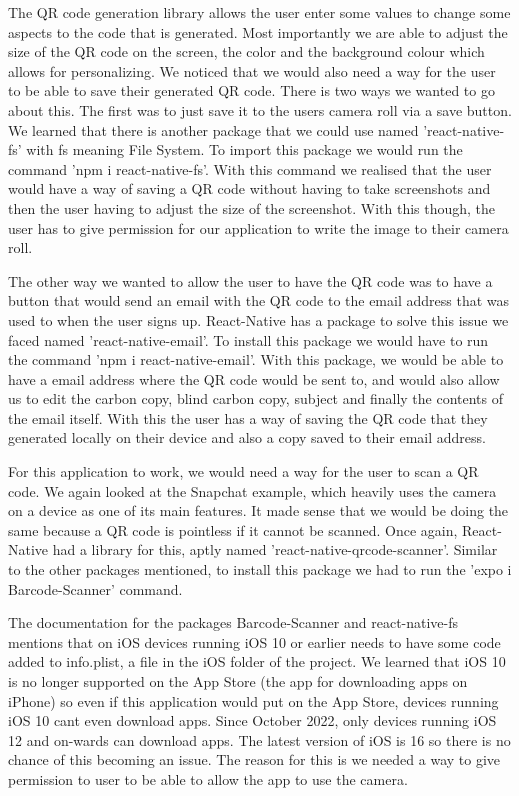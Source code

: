The QR code generation library allows the user enter some values to change some aspects to the code that is generated. Most importantly we are able to adjust the size of the QR code on the screen, the color and the background colour which allows for personalizing. We noticed that we would also need a way for the user to be able to save their generated QR code. There is two ways we wanted to go about this. The first was to just save it to the users camera roll via a save button. We learned that there is another package that we could use named 'react-native-fs'\cite{rnfs} with fs meaning File System. To import this package we would run the command 'npm i react-native-fs'. With this command we realised that the user would have a way of saving a QR code without having to take screenshots and then the user having to adjust the size of the screenshot. With this though, the user has to give permission for our application to write the image to their camera roll. 

The other way we wanted to allow the user to have the QR code was to have a button that would send an email with the QR code to the email address that was used to when the user signs up. React-Native has a package to solve this issue we faced named 'react-native-email\cite{npmEmail}'. To install this package we would have to run the command 'npm i react-native-email'. With this package, we would be able to have a email address where the QR code would be sent to, and would also allow us to edit the carbon copy, blind carbon copy, subject and finally the contents of the email itself. With this the user has a way of saving the QR code that they generated locally on their device and also a copy saved to their email address. 

For this application to work, we would need a way for the user to scan a QR code. We again looked at the Snapchat example, which heavily uses the camera on a device as one of its main features. It made sense that we would be doing the same because a QR code is pointless if it cannot be scanned. Once again, React-Native had a library for this, aptly named 'react-native-qrcode-scanner'. Similar to the other packages mentioned, to install this package we had to run the 'expo i Barcode-Scanner' command\cite{barCodeScaner}.

The documentation for the packages Barcode-Scanner and react-native-fs mentions that on iOS devices running iOS 10 or earlier needs to have some code added to info.plist, a file in the iOS folder of the project. We learned that iOS 10 is no longer supported on the App Store (the app for downloading apps on iPhone) so even if this application would put on the App Store, devices running iOS 10 cant even download apps. Since October 2022, only devices running iOS 12 and on-wards can download apps. The latest version of iOS is 16 so there is no chance of this becoming an issue. The reason for this is we needed a way to give permission to user to be able to allow the app to use the camera. 

